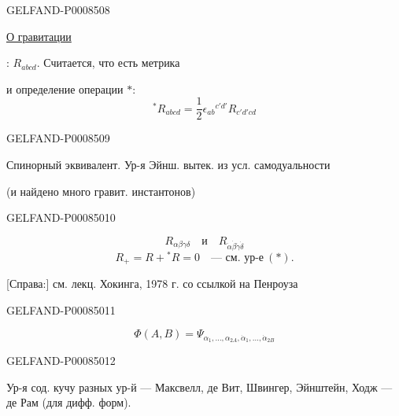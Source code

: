 \begin{GelfandAdjacentEvidence}{GELFAND-P000850}{8}


\uline{О гравитации}

: \(R_{abcd}\). Считается, что есть метрика

и определение операции \(*\):
\[
{}^*R_{abcd}=\frac12\epsilon_{ab}{}^{c'd'}R_{c'd'cd} \tag{13}
\]
\end{GelfandAdjacentEvidence}
\begin{GelfandAdjacentEvidence}{GELFAND-P000850}{9}


Спинорный эквивалент. Ур-я Эйнш. вытек. из усл. самодуальности

(и найдено много гравит. инстантонов)
\end{GelfandAdjacentEvidence}
\begin{GelfandAdjacentEvidence}{GELFAND-P000850}{10}

\[
R_{\alpha\beta\gamma\delta}\quad\text{и}\quad R_{\dot\alpha\dot\beta\dot\gamma\dot\delta}
\]
\[
R_+=R+{}^*R=0\quad\text{— см. ур-е}\ (*).
\]

[Справа:] см. лекц. Хокинга, 1978 г. со ссылкой на Пенроуза
\end{GelfandAdjacentEvidence}
\begin{GelfandAdjacentEvidence}{GELFAND-P000850}{11}


\[
\Phi(A,B)=\Psi_{\alpha_1,\ldots,\alpha_{2A},\dot\alpha_1,\ldots,\dot\alpha_{2B}} \tag{14}
\]
\end{GelfandAdjacentEvidence}
\begin{GelfandAdjacentEvidence}{GELFAND-P000850}{12}


Ур-я сод. кучу разных ур-й — Максвелл, де Вит, Швингер, Эйнштейн, Ходж — де Рам (для дифф. форм).
\end{GelfandAdjacentEvidence}


